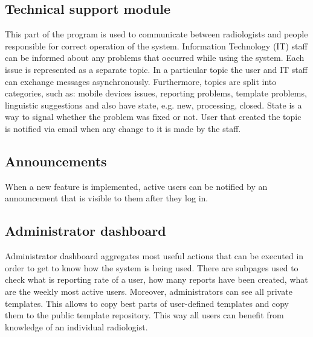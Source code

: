 \documentclass[12pt, twoside, openany]{report}
\theoremstyle{definition}
\begin{document}
\subsection{Technical support module}
This part of the program is used to communicate between radiologists and people responsible for correct operation of the system. Information Technology (IT) staff can be informed about any problems that occurred while using the system. Each issue is represented as a separate topic. In a particular topic the user and IT staff can exchange messages asynchronously. Furthermore, topics are split into categories, such as: mobile devices issues, reporting problems, template problems, linguistic suggestions and also have state, e.g. new, processing, closed. State is a way to signal whether the problem was fixed or not. User that created the topic is notified via email when any change to it is made by the staff.
\subsection{Announcements}
When a new feature is implemented, active users can be notified by an announcement that is visible to them after they log in. 
\subsection{Administrator dashboard}
Administrator dashboard aggregates most useful actions that can be executed in order to get to know how the system is being used. There are subpages used to check what is reporting rate of a user, how many reports have been created, what are the weekly most active users. 
Moreover, administrators can see all private templates. This allows to copy best parts of user-defined templates and copy them to the public template repository. This way all users can benefit from knowledge of an individual radiologist.
\end{document}
